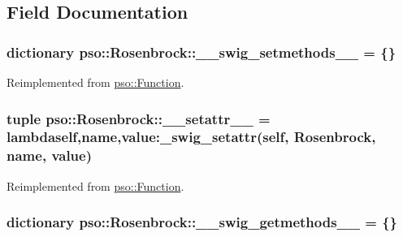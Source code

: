 \subsection{Field Documentation}
\hypertarget{classpso_1_1Rosenbrock_7b19f06e4baa11a3daf3c6faccdb7241}{
\subsubsection{\setlength{\rightskip}{0pt plus 5cm}dictionary {\bf pso::Rosenbrock::\_\-\_\-swig\_\-setmethods\_\-\_\-} = \{\}}}
\label{classpso_1_1Rosenbrock_7b19f06e4baa11a3daf3c6faccdb7241}




Reimplemented from \hyperlink{classpso_1_1Function_2334bfe507115d58047f67960dde71d3}{pso::Function}.\hypertarget{classpso_1_1Rosenbrock_20daa93c52410a96f8e6affaaed83d36}{
\subsubsection{\setlength{\rightskip}{0pt plus 5cm}tuple {\bf pso::Rosenbrock::\_\-\_\-setattr\_\-\_\-} = lambdaself,name,value:\_\-swig\_\-setattr(self, {\bf Rosenbrock}, name, value)}}
\label{classpso_1_1Rosenbrock_20daa93c52410a96f8e6affaaed83d36}




Reimplemented from \hyperlink{classpso_1_1Function_cd8775cf6aadc3fdf4e6d82158ef10fb}{pso::Function}.\hypertarget{classpso_1_1Rosenbrock_5228ee78176ce890dca261f8e0b5b20a}{
\subsubsection{\setlength{\rightskip}{0pt plus 5cm}dictionary {\bf pso::Rosenbrock::\_\-\_\-swig\_\-getmethods\_\-\_\-} = \{\}}}
\label{classpso_1_1Rosenbrock_5228ee78176ce890dca261f8e0b5b20a}




